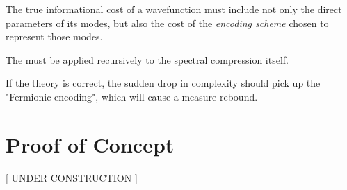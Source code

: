 The true informational cost of a wavefunction must include not only the direct parameters of its modes, but also the cost of the \emph{encoding scheme} chosen to represent those modes.

The  must be applied recursively to the spectral compression itself.

If the theory is correct, the sudden drop in complexity should pick up the "Fermionic encoding", which will cause a measure-rebound.


\section{Proof of Concept}

[ UNDER CONSTRUCTION ]


